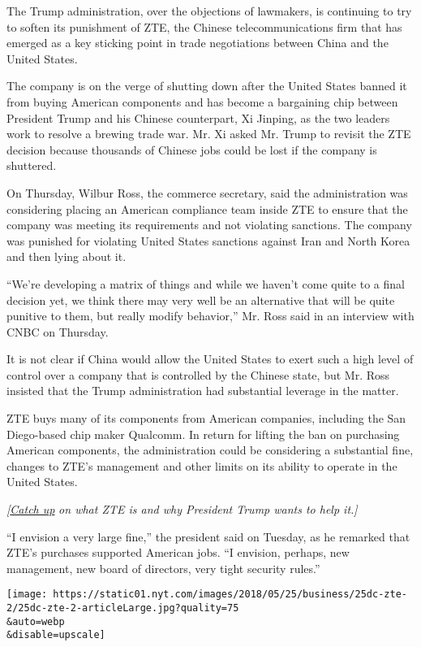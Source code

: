 The Trump administration, over the objections of lawmakers, is
continuing to try to soften its punishment of ZTE, the Chinese
telecommunications firm that has emerged as a key sticking point in
trade negotiations between China and the United States.

The company is on the verge of shutting down after the United States
banned it from buying American components and has become a bargaining
chip between President Trump and his Chinese counterpart, Xi Jinping, as
the two leaders work to resolve a brewing trade war. Mr. Xi asked Mr.
Trump to revisit the ZTE decision because thousands of Chinese jobs
could be lost if the company is shuttered.

On Thursday, Wilbur Ross, the commerce secretary, said the
administration was considering placing an American compliance team
inside ZTE to ensure that the company was meeting its requirements and
not violating sanctions. The company was punished for violating United
States sanctions against Iran and North Korea and then lying about it.

``We're developing a matrix of things and while we haven't come quite to
a final decision yet, we think there may very well be an alternative
that will be quite punitive to them, but really modify behavior,'' Mr.
Ross said in an interview with CNBC on Thursday.

It is not clear if China would allow the United States to exert such a
high level of control over a company that is controlled by the Chinese
state, but Mr. Ross insisted that the Trump administration had
substantial leverage in the matter.

ZTE buys many of its components from American companies, including the
San Diego-based chip maker Qualcomm. In return for lifting the ban on
purchasing American components, the administration could be considering
a substantial fine, changes to ZTE's management and other limits on its
ability to operate in the United States.

\emph{{[}}\href{https://www.nytimes.com/2018/06/07/business/what-is-zte.html}{\emph{Catch
up}} \emph{on what ZTE is and why President Trump wants to help it.{]}}

``I envision a very large fine,'' the president said on Tuesday, as he
remarked that ZTE's purchases supported American jobs. ``I envision,
perhaps, new management, new board of directors, very tight security
rules.''

\texttt{[image: https://static01.nyt.com/images/2018/05/25/business/25dc-zte-2/25dc-zte-2-articleLarge.jpg?quality=75\\\&auto=webp\\\&disable=upscale]}

